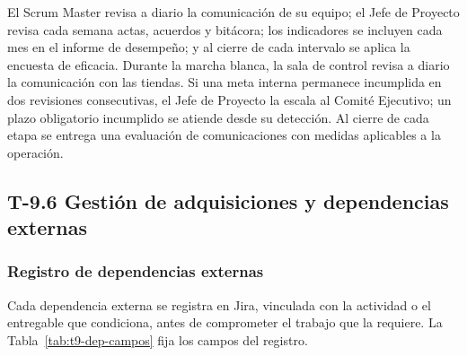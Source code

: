 \documentclass[11pt]{article}
\begin{document}
El Scrum Master revisa a diario la comunicación de su equipo; el Jefe de Proyecto revisa cada semana actas, acuerdos y bitácora; los indicadores se incluyen cada mes en el informe de desempeño; y al cierre de cada intervalo se aplica la encuesta de eficacia. Durante la marcha blanca, la sala de control revisa a diario la comunicación con las tiendas. Si una meta interna permanece incumplida en dos revisiones consecutivas, el Jefe de Proyecto la escala al Comité Ejecutivo; un plazo obligatorio incumplido se atiende desde su detección. Al cierre de cada etapa se entrega una evaluación de comunicaciones con medidas aplicables a la operación.

\subsection{T-9.6 Gestión de adquisiciones y dependencias externas}\label{t9-6}

\subsubsection{Registro de dependencias externas}\label{t9-6-registro}

Cada dependencia externa se registra en Jira, vinculada con la actividad o el entregable que condiciona, antes de comprometer el trabajo que la requiere. La Tabla~\mbox{\ref{tab:t9-dep-campos}} fija los campos del registro.
\end{document}
